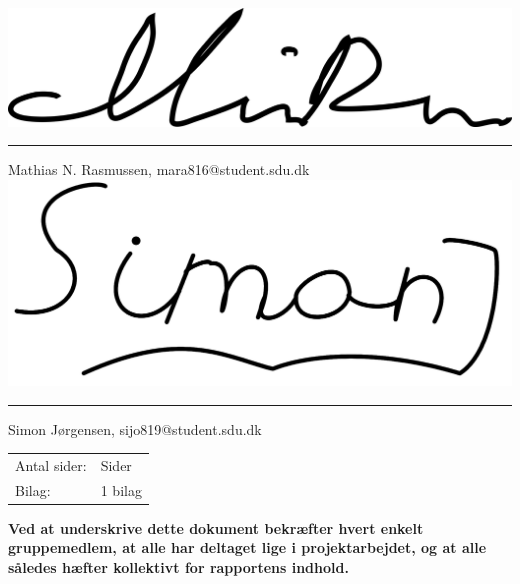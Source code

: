 \noindent
\includegraphics[scale=0.120]{figures/signatures/Signatur_mara816.png}
\vspace{-5mm}
\par\noindent\rule{\textwidth}{0.4pt}
\noindent
Mathias N. Rasmussen, mara816@student.sdu.dk\\

\noindent
\includegraphics[scale=0.042]{figures/signatures/signatureSJ.png}
\vspace{-3.5mm}
\par\noindent\rule{\textwidth}{0.4pt}
\noindent
Simon Jørgensen, sijo819@student.sdu.dk\\



\noindent
\begin{tabular}{@{}l l}
Antal sider:    & \pageref{LastPage} Sider \\
Bilag:          & 1 bilag 
\end{tabular}

\vspace{3.5mm}

\begin{footnotesize}
\noindent
\textbf{Ved at underskrive dette dokument bekræfter hvert enkelt gruppemedlem, at alle
har deltaget lige i projektarbejdet, og at alle således hæfter kollektivt for rapportens indhold.}
\end{footnotesize}